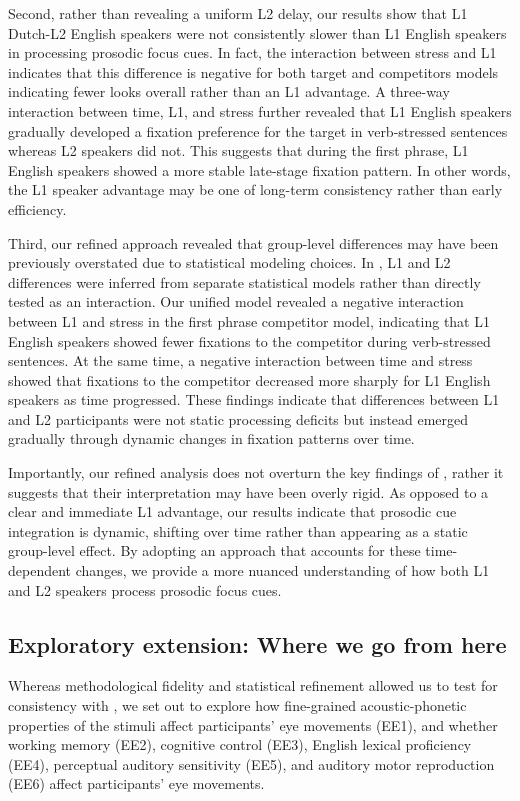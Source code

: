 Second, rather than revealing a uniform L2 delay, our results show that L1 Dutch-L2 English speakers were not consistently slower than L1 English speakers in processing prosodic focus cues. In fact, the interaction between stress and L1 indicates that this difference is negative for both target and competitors models indicating fewer looks overall rather than an L1 advantage. A three-way interaction between time, L1, and stress further revealed that L1 English speakers gradually developed a fixation preference for the target in verb-stressed sentences whereas L2 speakers did not. This suggests that during the first phrase, L1 English speakers showed a more stable late-stage fixation pattern. In other words, the L1 speaker advantage may be one of long-term consistency rather than early efficiency.

Third, our refined approach revealed that group-level differences may have been previously overstated due to statistical modeling choices. In \textcite{ge2021a}, L1 and L2 differences were inferred from separate statistical models rather than directly tested as an interaction. Our unified model revealed a negative interaction between L1 and stress in the first phrase competitor model, indicating that L1 English speakers showed fewer fixations to the competitor during verb-stressed sentences. At the same time, a negative interaction between time and stress showed that fixations to the competitor decreased more sharply for L1 English speakers as time progressed. These findings indicate that differences between L1 and L2 participants were not static processing deficits but instead emerged gradually through dynamic changes in fixation patterns over time.

Importantly, our refined analysis does not overturn the key findings of \textcite{ge2021a}, rather it suggests that their interpretation may have been overly rigid. As opposed to a clear and immediate L1 advantage, our results indicate that prosodic cue integration is dynamic, shifting over time rather than appearing as a static group-level effect. By adopting an approach that accounts for these time-dependent changes, we provide a more nuanced understanding of how both L1 and L2 speakers process prosodic focus cues.

\subsection{Exploratory extension: Where we go from here}

 Whereas methodological fidelity and statistical refinement allowed us to test for consistency with \textcite{ge2021a}, we set out to explore how fine-grained acoustic-phonetic properties of the stimuli affect participants' eye movements (EE1), and whether working memory (EE2), cognitive control (EE3), English lexical proficiency (EE4), perceptual auditory sensitivity (EE5), and auditory motor reproduction (EE6) affect participants' eye movements.
 
